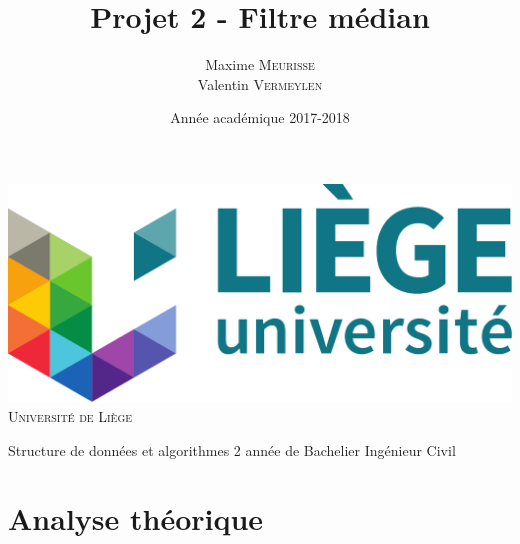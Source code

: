 \documentclass[a4paper, 12pt]{article}
\title{Projet 2 - Filtre médian}
\author{
	Maxime \textsc{Meurisse}\\Valentin \textsc{Vermeylen}\\
}
\date{Année académique 2017-2018}
\newcommand{\subtitle}{Structure de données et algorithmes}
\newcommand{\context}{2\ieme{} année de Bachelier Ingénieur Civil}
\begin{document}
	\makeatletter
	\begin{titlepage}
		\begin{minipage}[t][0.425\textheight][t]{\textwidth}
			\begin{center}
				\includegraphics[height=0.15\textheight]{resources/pdf/logo-uliege.pdf}
				\vfill
				{\huge \textsc{Université de Liège}}
				\vfill
			\end{center}
		\end{minipage}
		\vfill
		\begin{minipage}{\textwidth}
			\hspace{6pt}
			\begin{mdframed}[linewidth = 2pt, innertopmargin = 12pt, innerbottommargin = 12pt, leftline = false, rightline = false]
				\begin{center}
					{\huge \bfseries \@title}
				\end{center}
			\end{mdframed}
			\hspace{6pt}
		\end{minipage}
		\vfill
		\begin{minipage}[b][0.425\textheight][t]{\textwidth}
			\begin{center}
				{\LARGE \subtitle}
				\vfill
				{\large \@author\space}
				\vfill
				{\large \context \\[6pt] \@date}
			\end{center}
		\end{minipage}
	\end{titlepage}
	\makeatother
	\restoregeometry
	\section{Analyse théorique}
\end{document}
